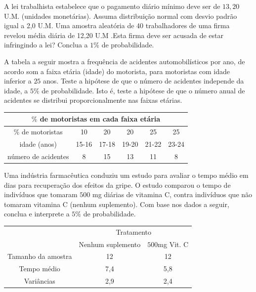 \documentclass{report}
\begin{document}
\begin{Exercise}
\Question A lei trabalhista estabelece que o pagamento diário mínimo deve ser de $13,20$ U.M. (unidades monetárias). Assuma distribuição normal com desvio 
padrão igual a 2,0 U.M. Uma amostra aleatória de 40 trabalhadores de uma firma revelou média diária de 12,20 U.M .Esta firma deve ser acusada de estar 
infringindo a lei? Conclua a $1\%$ de probabilidade.

\Question A tabela a seguir mostra a frequência de acidentes automobilísticos por ano, de acordo som a faixa etária (idade) do motorista, para motoristas com 
idade inferior a $25$ anos. Teste a hipótese de que o número de acidentes independe da idade, a $5\%$ de probabilidade. Isto é, teste a hipótese de que o número 
anual de acidentes se distribui proporcionalmente nas faixas etárias.

\begin{table}[H]
\centering
\begin{tabular}{cccccc}
\hline \hline
\multicolumn{6}{c}{$\%$ de motoristas em cada faixa etária}\\
\hline\hline
$\%$ de motoristas& 10                &20              &20 & 25 & 25                 \\
idade (anos)            &15-16           &17-18        &19-20 & 21-22 & 23-24                 \\
\hline
número de acidentes &8 & 15 & 13 & 11 & 8 \\
\hline \hline
\end{tabular}
\end{table}

\Question Uma indústria farmacêutica conduziu um estudo para avaliar o tempo médio em dias para recuperação dos efeitos da gripe. O estudo comparou o tempo 
de indivíduos que tomaram $500$ mg diárias de vitamina C, contra  indivíduos que não tomaram vitamina C (nenhum suplemento). Com base nos dados a seguir, 
conclua e interprete a $5\%$ de probabilidade.

\begin{table}[H]
\centering
\begin{tabular}{ccc}
\hline \hline
                                      &\multicolumn{2}{c}{Tratamento}\\
																			\cline{2-3}
                                      &Nenhum suplemento&$500$mg Vit. C        \\
\hline\hline
Tamanho da amostra& 12           &12      \\
Tempo médio            & 7,4           &5,8     \\
Variâncias                   & 2,9          &2,4     \\
\hline \hline
\end{tabular}
\end{table}


\end{Exercise}
\end{document}
